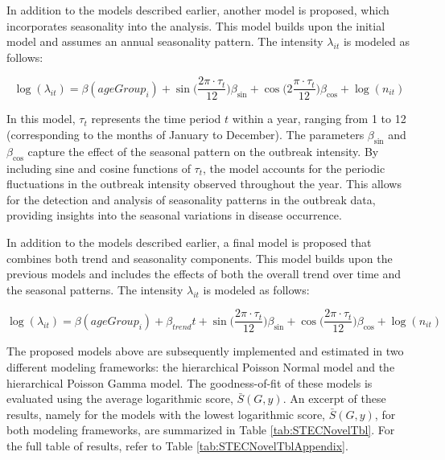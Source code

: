 \documentclass[a4paper,twoside,11pt]{report} %
\theoremstyle{definition}
\theoremstyle{definition}
\theoremstyle{definition}
\theoremstyle{definition}
\theoremstyle{remark}
\begin{document}
In addition to the models described earlier, another model is proposed, which incorporates seasonality into the analysis. This model builds upon the initial model and assumes an annual seasonality pattern. The intensity \(\lambda_{it}\) is modeled as follows:

\begin{equation}
\log(\lambda_{it})=\beta(ageGroup_{i})+ \sin \big(\frac{2\pi\cdot \tau_t}{12}\big) \beta_{\sin} + \cos \big(2\frac{\pi\cdot \tau_t}{12}\big) \beta_{\cos} + \log(n_{it})
\end{equation}

In this model, \(\tau_t\) represents the time period \(t\) within a year, ranging from 1 to 12 (corresponding to the months of January to December). The parameters \(\beta_{\sin}\) and \(\beta_{\cos}\) capture the effect of the seasonal pattern on the outbreak intensity. By including sine and cosine functions of \(\tau_t\), the model accounts for the periodic fluctuations in the outbreak intensity observed throughout the year. This allows for the detection and analysis of seasonality patterns in the outbreak data, providing insights into the seasonal variations in disease occurrence.

In addition to the models described earlier, a final model is proposed that combines both trend and seasonality components. This model builds upon the previous models and includes the effects of both the overall trend over time and the seasonal patterns. The intensity \(\lambda_{it}\) is modeled as follows:

\begin{equation}\label{eq:AgegroupTrendSeasonality}
  \log(\lambda_{it})=\beta(ageGroup_{i}) + \beta_{trend} t + \sin \big(\frac{2\pi\cdot \tau_t}{12}\big) \beta_{\sin} + \cos \big(\frac{2\pi\cdot \tau_t}{12}\big)\beta_{\cos} + \log(n_{it})
\end{equation}

The proposed models above are subsequently implemented and estimated in two different modeling frameworks: the hierarchical Poisson Normal model and the hierarchical Poisson Gamma model. The goodness-of-fit of these models is evaluated using the average logarithmic score, \(\bar{S}(G,y)\). An excerpt of these results, namely for the models with the lowest logarithmic score, \(\bar{S}(G,y)\), for both modeling frameworks, are summarized in Table \ref{tab:STECNovelTbl}. For the full table of results, refer to Table \ref{tab:STECNovelTblAppendix}.
\end{document}
